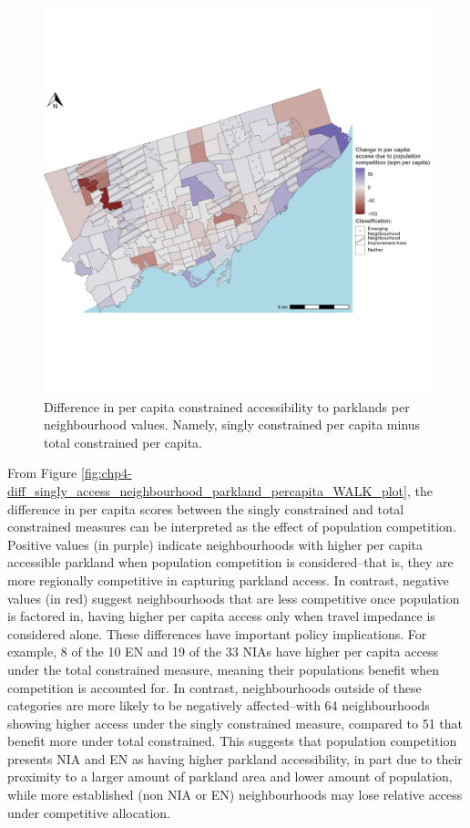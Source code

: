 \documentclass[
11pt, %
oneside, %
english, %
singlespacing, %
]{macthesis} %
\begin{document}
\begin{figure}

{\centering \includegraphics[width=6in]{./data/figures/chp4-diff_singly_access_neighbourhood_parkland_percapita_WALK_plot} 

}

\caption{\label{fig:chp4-diff_singly_access_neighbourhood_parkland_percapita_WALK_plot} Difference in per capita constrained accessibility to parklands per neighbourhood values. Namely, singly constrained per capita  minus total constrained per capita. }\label{fig:unnamed-chunk-63}
\end{figure}

From Figure \ref{fig:chp4-diff_singly_access_neighbourhood_parkland_percapita_WALK_plot}, the difference in per capita scores between the singly constrained and total constrained measures can be interpreted as the effect of population competition. Positive values (in purple) indicate neighbourhoods with higher per capita accessible parkland when population competition is considered--that is, they are more regionally competitive in capturing parkland access. In contrast, negative values (in red) suggest neighbourhoods that are less competitive once population is factored in, having higher per capita access only when travel impedance is considered alone. These differences have important policy implications. For example, 8 of the 10 EN and 19 of the 33 NIAs have higher per capita access under the total constrained measure, meaning their populations benefit when competition is accounted for. In contrast, neighbourhoods outside of these categories are more likely to be negatively affected--with 64 neighbourhoods showing higher access under the singly constrained measure, compared to 51 that benefit more under total constrained. This suggests that population competition presents NIA and EN as having higher parkland accessibility, in part due to their proximity to a larger amount of parkland area and lower amount of population, while more established (non NIA or EN) neighbourhoods may lose relative access under competitive allocation.
\end{document}
